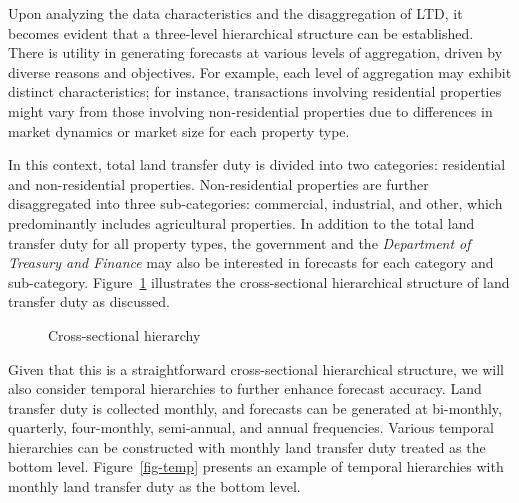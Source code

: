 \documentclass[
  11pt,
  a4paper,
]{article}
\begin{document}
Upon analyzing the data characteristics and the disaggregation of LTD,
it becomes evident that a three-level hierarchical structure can be
established. There is utility in generating forecasts at various levels
of aggregation, driven by diverse reasons and objectives. For example,
each level of aggregation may exhibit distinct characteristics; for
instance, transactions involving residential properties might vary from
those involving non-residential properties due to differences in market
dynamics or market size for each property type.

In this context, total land transfer duty is divided into two
categories: residential and non-residential properties. Non-residential
properties are further disaggregated into three sub-categories:
commercial, industrial, and other, which predominantly includes
agricultural properties. In addition to the total land transfer duty for
all property types, the government and the \emph{Department of Treasury
and Finance} may also be interested in forecasts for each category and
sub-category. Figure~\ref{fig-crosssec} illustrates the cross-sectional
hierarchical structure of land transfer duty as discussed.

\begin{figure}


\caption{\label{fig-crosssec}Cross-sectional hierarchy}

\end{figure}%

Given that this is a straightforward cross-sectional hierarchical
structure, we will also consider temporal hierarchies to further enhance
forecast accuracy. Land transfer duty is collected monthly, and
forecasts can be generated at bi-monthly, quarterly, four-monthly,
semi-annual, and annual frequencies. Various temporal hierarchies can be
constructed with monthly land transfer duty treated as the bottom level.
Figure~\ref{fig-temp} presents an example of temporal hierarchies with
monthly land transfer duty as the bottom level.
\end{document}
